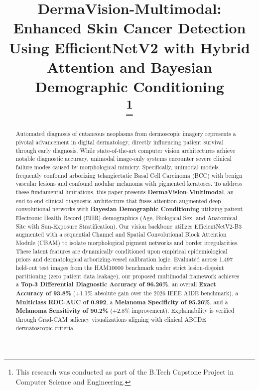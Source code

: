 ﻿\documentclass[conference]{IEEEtran}
\begin{document}
\title{DermaVision-Multimodal: Enhanced Skin Cancer Detection Using EfficientNetV2 with Hybrid Attention and Bayesian Demographic Conditioning\\
\thanks{This research was conducted as part of the B.Tech Capstone Project in Computer Science and Engineering.}}

\author{
}

\maketitle

\begin{abstract}
Automated diagnosis of cutaneous neoplasms from dermoscopic imagery represents a pivotal advancement in digital dermatology, directly influencing patient survival through early diagnosis. While state-of-the-art computer vision architectures achieve notable diagnostic accuracy, unimodal image-only systems encounter severe clinical failure modes caused by morphological mimicry. Specifically, unimodal models frequently confound arborizing telangiectatic Basal Cell Carcinoma (BCC) with benign vascular lesions and confound nodular melanoma with pigmented keratoses. To address these fundamental limitations, this paper presents \textbf{DermaVision-Multimodal}, an end-to-end clinical diagnostic architecture that fuses attention-augmented deep convolutional networks with \textbf{Bayesian Demographic Conditioning} utilizing patient Electronic Health Record (EHR) demographics (Age, Biological Sex, and Anatomical Site with Sun-Exposure Stratification). Our vision backbone utilizes EfficientNetV2-B3 augmented with a sequential Channel and Spatial Convolutional Block Attention Module (CBAM) to isolate morphological pigment networks and border irregularities. These latent features are dynamically conditioned upon empirical epidemiological priors and dermatological arborizing-vessel calibration logic. Evaluated across 1,497 held-out test images from the HAM10000 benchmark under strict lesion-disjoint partitioning (zero patient data leakage), our proposed multimodal framework achieves a \textbf{Top-3 Differential Diagnostic Accuracy of 96.26\%}, an overall \textbf{Exact Accuracy of 93.8\%} (+1.1\% absolute gain over the 2026 IEEE AIDE benchmark), a \textbf{Multiclass ROC-AUC of 0.992}, a \textbf{Melanoma Specificity of 95.26\%}, and a \textbf{Melanoma Sensitivity of 90.2\%} (+2.8\% improvement). Explainability is verified through Grad-CAM saliency visualizations aligning with clinical ABCDE dermatoscopic criteria.
\end{abstract}
\end{document}
